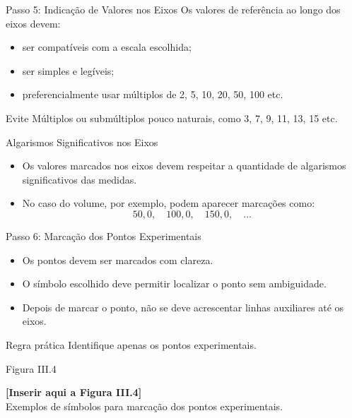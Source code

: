\documentclass[aspectratio=169]{beamer}
\begin{document}
\begin{frame}{Passo 5: Indicação de Valores nos Eixos}
Os valores de referência ao longo dos eixos devem:

\begin{itemize}
\item ser compatíveis com a escala escolhida;
\item ser simples e legíveis;
\item preferencialmente usar múltiplos de 2, 5, 10, 20, 50, 100 etc.
\end{itemize}

\begin{alertblock}{Evite}
Múltiplos ou submúltiplos pouco naturais, como 3, 7, 9, 11, 13, 15 etc.
\end{alertblock}
\end{frame}

\begin{frame}{Algarismos Significativos nos Eixos}
\begin{itemize}
\item Os valores marcados nos eixos devem respeitar a quantidade de algarismos significativos das medidas.
\item No caso do volume, por exemplo, podem aparecer marcações como:
\[
50{,}0,\quad 100{,}0,\quad 150{,}0,\quad \dots
\]
\end{itemize}
\end{frame}

\begin{frame}{Passo 6: Marcação dos Pontos Experimentais}
\begin{itemize}
\item Os pontos devem ser marcados com clareza.
\item O símbolo escolhido deve permitir localizar o ponto sem ambiguidade.
\item Depois de marcar o ponto, não se deve acrescentar linhas auxiliares até os eixos.
\end{itemize}

\begin{block}{Regra prática}
Identifique apenas os pontos experimentais.
\end{block}
\end{frame}

\begin{frame}{Figura III.4}
\begin{center}
\Large \textbf{[Inserir aqui a Figura III.4]}\\[1ex]
\normalsize Exemplos de símbolos para marcação dos pontos experimentais.
\end{center}
\end{frame}
\end{document}
